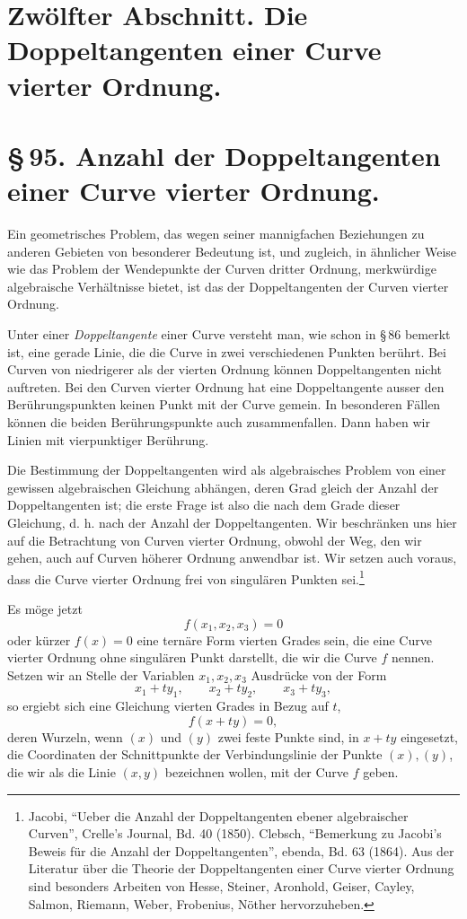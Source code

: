 \documentclass[11pt]{article}
\begin{document}
\section*{Zwölfter Abschnitt. Die Doppeltangenten einer Curve vierter Ordnung.}

\section*{\S\,95. Anzahl der Doppeltangenten einer Curve vierter Ordnung.}

Ein geometrisches Problem, das wegen seiner mannigfachen Beziehungen zu anderen Gebieten von besonderer Bedeutung ist, und zugleich, in ähnlicher Weise wie das Problem der Wendepunkte der Curven dritter Ordnung, merkwürdige algebraische Verhältnisse bietet, ist das der Doppeltangenten der Curven vierter Ordnung.

Unter einer \emph{Doppeltangente} einer Curve versteht man, wie schon in \S\,86 bemerkt ist, eine gerade Linie, die die Curve in zwei verschiedenen Punkten berührt. Bei Curven von niedrigerer als der vierten Ordnung können Doppeltangenten nicht auftreten. Bei den Curven vierter Ordnung hat eine Doppeltangente ausser den Berührungspunkten keinen Punkt mit der Curve gemein. In besonderen Fällen können die beiden Berührungspunkte auch zusammenfallen. Dann haben wir Linien mit vierpunktiger Berührung.

Die Bestimmung der Doppeltangenten wird als algebraisches Problem von einer gewissen algebraischen Gleichung abhängen, deren Grad gleich der Anzahl der Doppeltangenten ist; die erste Frage ist also die nach dem Grade dieser Gleichung, d. h. nach der Anzahl der Doppeltangenten. Wir beschränken uns hier auf die Betrachtung von Curven vierter Ordnung, obwohl der Weg, den wir gehen, auch auf Curven höherer Ordnung anwendbar ist. Wir setzen auch voraus, dass die Curve vierter Ordnung frei von singulären Punkten sei.\footnote{Jacobi, ``Ueber die Anzahl der Doppeltangenten ebener algebraischer Curven'', Crelle's Journal, Bd. 40 (1850). Clebsch, ``Bemerkung zu Jacobi's Beweis für die Anzahl der Doppeltangenten'', ebenda, Bd. 63 (1864). Aus der Literatur über die Theorie der Doppeltangenten einer Curve vierter Ordnung sind besonders Arbeiten von Hesse, Steiner, Aronhold, Geiser, Cayley, Salmon, Riemann, Weber, Frobenius, Nöther hervorzuheben.}

Es möge jetzt
\begin{equation}
 f(x_1,x_2,x_3)=0
 \tag{1}
\end{equation}
oder kürzer \(f(x)=0\) eine ternäre Form vierten Grades sein, die eine Curve vierter Ordnung ohne singulären Punkt darstellt, die wir die Curve \(f\) nennen. Setzen wir an Stelle der Variablen \(x_1,x_2,x_3\) Ausdrücke von der Form
\[
 x_1+t y_1,\qquad x_2+t y_2,\qquad x_3+t y_3,
\]
so ergiebt sich eine Gleichung vierten Grades in Bezug auf \(t\),
\begin{equation}
 f(x+t y)=0,
 \tag{2}
\end{equation}
deren Wurzeln, wenn \((x)\) und \((y)\) zwei feste Punkte sind, in \(x+t y\) eingesetzt, die Coordinaten der Schnittpunkte der Verbindungslinie der Punkte \((x),(y)\), die wir als die Linie \((x,y)\) bezeichnen wollen, mit der Curve \(f\) geben.
\end{document}
